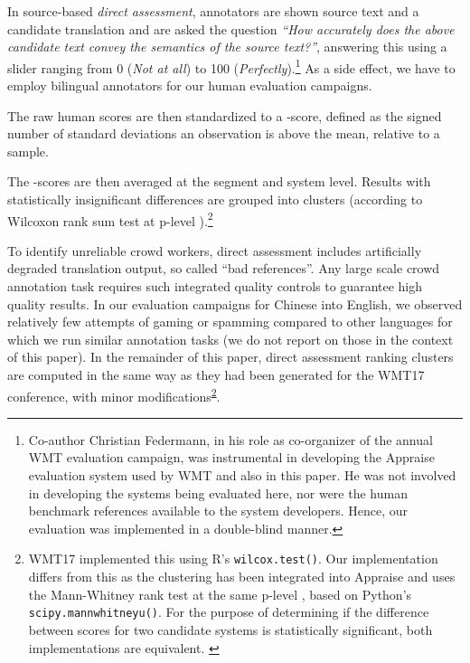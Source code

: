 \documentclass[a4paper]{article}
\begin{document}
\begin{CJK*}{UTF8}{gbsn}
In source-based \emph{direct assessment}, annotators are shown source text and a candidate translation and are asked the question \emph{``How accurately does the above candidate text convey the semantics of the source text?''}, answering this using a slider ranging from 0 (\emph{Not at all}) to 100 (\emph{Perfectly}).\footnote{Co-author Christian Federmann, in his role as co-organizer of the annual WMT evaluation campaign, was instrumental in developing the Appraise evaluation system used by WMT and also in this paper. He was not involved in developing the systems being evaluated here, nor were the human benchmark references available to the system developers. Hence, our evaluation was implemented in a double-blind manner.} As a side effect, we have to employ bilingual annotators for our human evaluation campaigns.


The raw human scores are then standardized to a -score, defined as the signed number of standard deviations an observation is above the mean, relative to a sample.

The -scores are then averaged at the segment and system level. Results with statistically insignificant differences are grouped into clusters (according to Wilcoxon rank sum test \cite{wilcoxon1945individual} at p-level ).\footnote{WMT17 implemented this using R's \texttt{wilcox.test()}. Our implementation differs from this as the clustering has been integrated into Appraise and uses the Mann-Whitney rank test \cite{mann1947test} at the same p-level , based on Python's \texttt{scipy.mannwhitneyu()}. For the purpose of determining if the difference between scores for two candidate systems is statistically significant, both implementations are equivalent. \label{da-implementation-diffs}}



To identify unreliable crowd workers, direct assessment includes artificially degraded translation output, so called ``bad references''. Any large scale crowd annotation task requires such integrated quality controls to guarantee high quality results. In our evaluation campaigns for Chinese into English, we observed relatively few attempts of gaming or spamming compared to other languages for which we run similar annotation tasks (we do not report on those in the context of this paper). In the remainder of this paper, direct assessment ranking clusters are computed in the same way as they had been generated for the WMT17 conference, with minor modifications\textsuperscript{\ref{da-implementation-diffs}}.
 

\end{CJK*}
\end{document}
